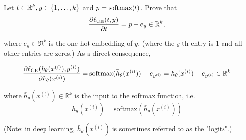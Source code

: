\item {} 





Let $t\in \R^k, y\in \{1,\dots, k\}$ and $p = \softmax(t)$. 
Prove that 
\begin{align}
\frac{\partial \ell_\textup{CE}(t, y)}{\partial t} = p - e_y \in \Re^k,
\end{align}

where $e_y\in \Re^k$ is the one-hot embedding of $y$, (where the $y$-th entry is 1 and all other entries are zeros.)
As a direct consequence, 

\begin{align}
\frac{\partial \ell_\textup{CE}(\bar{h}_{\theta}(x^{(i)}), y^{(i)})}{\partial \bar{h}_{\theta}(x^{(i)})} = \mathrm{softmax}(\bar{h}_{\theta}(x^{(i)})) - e_{y^{(i)}}  = {h}_{\theta}(x^{(i)})- e_{y^{(i)}}\in \Re^k
\end{align}








where $\bar{h}_{\theta}(x^{(i)}) \in \mathbb{R}^k$ is the input to the softmax function, i.e. $${h}_{\theta}(x^{(i)}) = \mathrm{softmax}(\bar{h}_{\theta}(x^{(i)}))$$

(Note: in deep learning, $\bar{h}_{\theta}(x^{(i)})$ is sometimes referred to as the "logits".)

